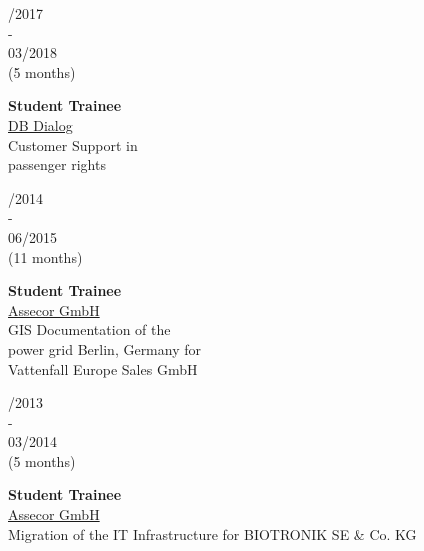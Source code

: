 \documentclass{article}
\begin{document}
\begin{minipage}[t]{0.7\textwidth}
		\begin{minipage}[t]{0.52\textwidth}
		\begin{minipage}[t]{0.25\textwidth}
		/2017\\ -\\ 03/2018\\(5 months)
		\end{minipage}
		\hfill
		\begin{minipage}[t]{0.75\textwidth}
		\textbf{Student Trainee}\\ \href{https://assecor.de/}{\color{pblue}DB Dialog}\\
	    Customer Support in\\ passenger rights
		\end{minipage}
		
		\vspace{0.2cm}

		
		\begin{minipage}[t]{0.25\textwidth}
		/2014\\ -\\ 06/2015\\(11 months)
		\end{minipage}
		\hfill
		\begin{minipage}[t]{0.75\textwidth}
		\textbf{Student Trainee}\\
		\href{https://assecor.de/}{\color{pblue}Assecor GmbH}\\
	    GIS Documentation of the \\power grid Berlin, Germany for \\Vattenfall Europe Sales GmbH
		\end{minipage}
	
		\vspace{0.2cm}
			
		\begin{minipage}[t]{0.25\textwidth}
		/2013\\ -\\ 03/2014 \\(5 months)
		\end{minipage}
		\hfill
		\begin{minipage}[t]{0.75\textwidth}
		\textbf{Student Trainee}\\
		\href{https://assecor.de/}{\color{pblue}Assecor GmbH}\\
	     Migration of the IT Infrastructure for BIOTRONIK SE \& Co. KG
		\end{minipage}
		

\end{minipage}
\end{minipage}
\end{document}
